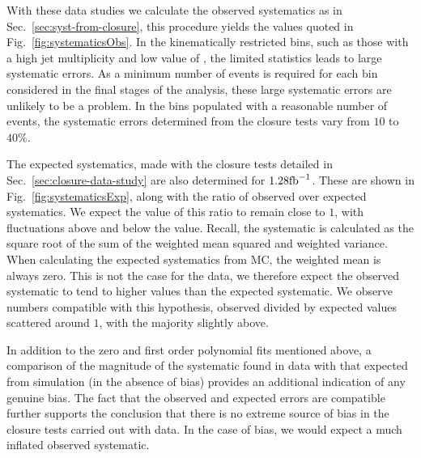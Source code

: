 
With these data studies we calculate the observed systematics as in
Sec.~\ref{sec:syst-from-closure},
this procedure yields the values quoted in
Fig.~\ref{fig:systematicsObs}. In the kinematically restricted bins, such
as those with a high jet multiplicity and low value of \scalht, the
limited statistics leads to large systematic errors. As a minimum number of
events is required for each bin considered in the final stages of the
analysis, these large systematic errors are unlikely to be a problem.
In the bins populated with a reasonable number of events, the
systematic errors determined from the closure tests vary from $10$ to
$40\%$.

The expected systematics, made with the
closure tests detailed in Sec.~\ref{sec:closure-data-study} are also
determined for $1.28\text{fb}^{-1}$. These are shown in
Fig.~\ref{fig:systematicsExp}, along with the ratio of observed over
expected systematics. We expect the value of this ratio to remain
close to $1$, with
fluctuations above and below the value. Recall, the
systematic is calculated as the square root of the sum of the weighted
mean squared and weighted variance. When calculating the expected
systematics from MC, the weighted mean is always zero. This is not the
case for the data, we therefore expect the observed systematic to
tend to higher values than the expected systematic. We observe numbers
compatible with this hypothesis, observed divided by expected values
scattered around $1$, with the majority slightly above. 

In addition to
the zero and first order polynomial fits mentioned above, a comparison
of the magnitude of the systematic found in data with that expected
from simulation (\ie in the absence of bias) provides an
additional indication of any genuine bias. The fact
that the observed and expected errors are compatible further supports
the conclusion that there is no extreme source of bias in the closure
tests carried out with data. In the case of bias, we would expect a
much inflated observed systematic.


